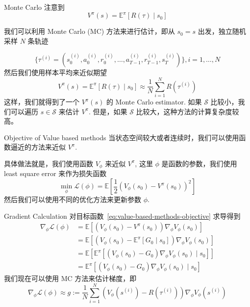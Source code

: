 \documentclass[aspectratio=169]{beamer}
\begin{document}
\begin{frame}{Monte Carlo}
    注意到
    \begin{equation}
    V^\pi(s) = \mathbb{E}^\pi\left[R(\tau)\mid s_0\right]
    \end{equation}

    我们可以利用 Monte Carlo (MC) 方法来进行估计，即从 $s_0=s$ 出发，独立随机采样 $N$ 条轨迹

    \begin{equation}
        \{\tau^{(i)}=(s_0^{(i)}, a_0^{(i)},r_0^{(i)},\dots,a_{T-1}^{(i)},r_{T-1}^{(i)}, s^{(i)}_{T})\}, i=1,\dots,N
    \end{equation}
    然后我们使用样本平均来近似期望
    \begin{equation}
        V^\pi(s) = \mathbb{E}^\pi\left[R(\tau)\mid s_0\right]\approx \frac{1}{N}\sum_{i=1}^NR(\tau^{(i)})
    \end{equation}
    这样，我们就得到了一个 $V^\pi(s)$ 的 Monte Carlo estimator.
    如果 $\mathcal{S}$ 比较小，我们可以遍历 $s\in\mathcal{S}$ 来估计 $V^\pi$. 但是，如果 $\mathcal{S}$ 比较大，这种方法的计算复杂度较高。

\end{frame}


\begin{frame}{Objective of Value based methods}
    当状态空间较大或者连续时，我们可以使用函数逼近的方法来近似 $V^\pi$.

    具体做法就是，我们使用函数 $V_\phi$ 来近似 $V^\pi$, 这里 $\phi$ 是函数的参数，我们使用 least square error 来作为损失函数
    \begin{equation}\label{eq:value-based-methods-objective}
        \min_{\phi} \mathcal{L}(\phi) =\mathbb{E}\left[\frac12\left(V_\phi(s_0)-V^\pi(s_0)\right)^2\right]
    \end{equation}
    然后我们可以使用不同的优化方法来更新参数 $\phi$.

\end{frame}

\begin{frame}{Gradient Calculation}
    对目标函数~\eqref{eq:value-based-methods-objective} 求导得到
    \begin{align}
    \nabla_\phi \mathcal{L}(\phi) &= \mathbb{E}\left[\left(V_\phi(s_0)-V^\pi(s_0)\right)\nabla_\phi V_\phi(s_0)\right]\\
    &= \mathbb{E}\left[\left(V_\phi(s_0)- \mathbb{E}^\pi\left[G_0\mid s_0\right]\right)\nabla_\phi V_\phi(s_0)\right]\\
    &=\mathbb{E}\left[\mathbb{E}^\pi\left[\left(V_\phi(s_0)- G_0\right)\nabla_\phi V_\phi(s_0)\mid s_0\right]\right]\\
    &= \mathbb{E}^\pi\left[\left(V_\phi(s_0)- G_0\right)\nabla_\phi V_\phi(s_0)\mid s_0\right]
    \end{align}
    我们现在可以使用 MC 方法来估计梯度，即
    \begin{equation}
        \nabla_\phi \mathcal{L}(\phi) \approx g:=\frac{1}{N}\sum_{i=1}^N\left(V_\phi(s^{(i)})- R(\tau^{(i)})\right)\nabla_\phi V_\phi(s^{(i)})
    \end{equation}
\end{frame}
\end{document}
